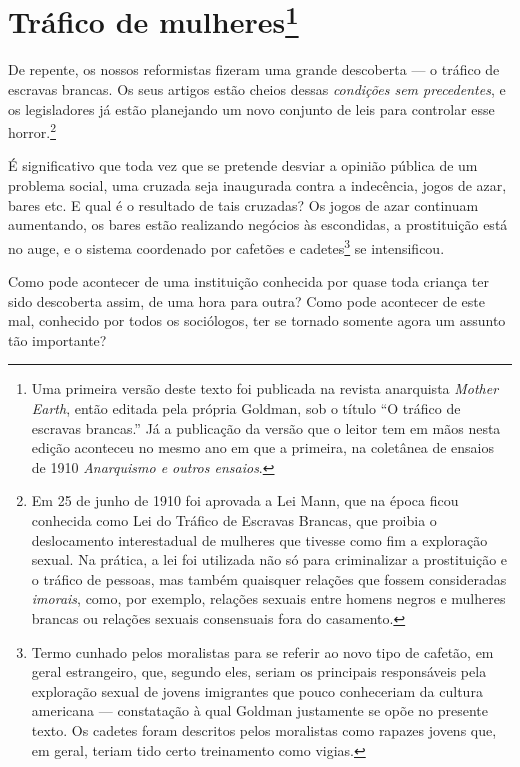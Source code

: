 \chapter{Tráfico de mulheres\footnote{Uma primeira versão deste texto foi
  publicada na revista anarquista \textit{Mother Earth}, então editada
  pela própria Goldman, sob o título ``O tráfico de escravas
  brancas.'' Já a publicação da versão que o leitor tem em mãos nesta edição aconteceu no mesmo ano em que a
  primeira, na coletânea de ensaios de 1910 \textit{Anarquismo e outros
  ensaios}.}}\label{trafico}

De repente, os nossos reformistas fizeram uma grande descoberta --- o
tráfico de escravas brancas. Os seus artigos estão cheios dessas
\textit{condições sem precedentes}, e os legisladores já estão planejando um
novo conjunto de leis para controlar esse horror.\footnote{Em 25 de
  junho de 1910 foi aprovada a Lei Mann, que na época ficou conhecida
  como Lei do Tráfico de Escravas Brancas, que proibia o deslocamento
  interestadual de mulheres que tivesse como fim a exploração sexual. Na
  prática, a lei foi utilizada não só para criminalizar a prostituição e
  o tráfico de pessoas, mas também quaisquer relações que fossem
  consideradas \textit{imorais}, como, por exemplo, relações sexuais entre
  homens negros e mulheres brancas ou relações sexuais consensuais fora
  do casamento.}

É significativo que toda vez que se pretende desviar a opinião pública
de um problema social, uma cruzada seja inaugurada contra a indecência,
jogos de azar, bares etc. E qual é o resultado de tais cruzadas? Os
jogos de azar continuam aumentando, os bares estão realizando negócios
às escondidas, a prostituição está no auge, e o sistema coordenado por
cafetões e cadetes\footnote{Termo cunhado pelos moralistas para se
  referir ao novo tipo de cafetão, em geral estrangeiro, que, segundo
  eles, seriam os principais responsáveis pela exploração sexual de
  jovens imigrantes que pouco conheceriam da cultura americana --- constatação à qual Goldman justamente se opõe no presente
  texto. Os cadetes foram descritos pelos moralistas como rapazes jovens
  que, em geral, teriam tido certo treinamento como vigias.} se
intensificou.

Como pode acontecer de uma instituição conhecida por quase toda criança
ter sido descoberta assim, de uma hora para outra? Como pode acontecer
de este mal, conhecido por todos os sociólogos, ter se tornado somente agora um
assunto tão importante?

